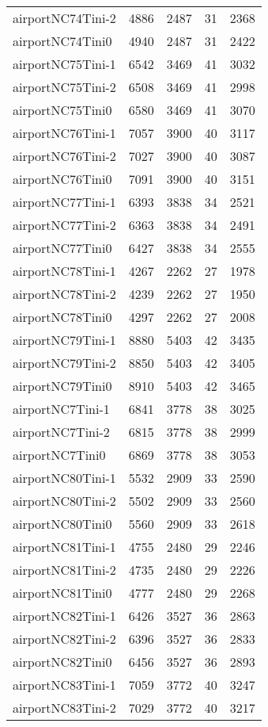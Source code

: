 \begin{longtable}{lrrrr}
airportNC74Tini-2 & 4886 & 2487 & 31 & 2368 \\
airportNC74Tini0 & 4940 & 2487 & 31 & 2422 \\
airportNC75Tini-1 & 6542 & 3469 & 41 & 3032 \\
airportNC75Tini-2 & 6508 & 3469 & 41 & 2998 \\
airportNC75Tini0 & 6580 & 3469 & 41 & 3070 \\
airportNC76Tini-1 & 7057 & 3900 & 40 & 3117 \\
airportNC76Tini-2 & 7027 & 3900 & 40 & 3087 \\
airportNC76Tini0 & 7091 & 3900 & 40 & 3151 \\
airportNC77Tini-1 & 6393 & 3838 & 34 & 2521 \\
airportNC77Tini-2 & 6363 & 3838 & 34 & 2491 \\
airportNC77Tini0 & 6427 & 3838 & 34 & 2555 \\
airportNC78Tini-1 & 4267 & 2262 & 27 & 1978 \\
airportNC78Tini-2 & 4239 & 2262 & 27 & 1950 \\
airportNC78Tini0 & 4297 & 2262 & 27 & 2008 \\
airportNC79Tini-1 & 8880 & 5403 & 42 & 3435 \\
airportNC79Tini-2 & 8850 & 5403 & 42 & 3405 \\
airportNC79Tini0 & 8910 & 5403 & 42 & 3465 \\
airportNC7Tini-1 & 6841 & 3778 & 38 & 3025 \\
airportNC7Tini-2 & 6815 & 3778 & 38 & 2999 \\
airportNC7Tini0 & 6869 & 3778 & 38 & 3053 \\
airportNC80Tini-1 & 5532 & 2909 & 33 & 2590 \\
airportNC80Tini-2 & 5502 & 2909 & 33 & 2560 \\
airportNC80Tini0 & 5560 & 2909 & 33 & 2618 \\
airportNC81Tini-1 & 4755 & 2480 & 29 & 2246 \\
airportNC81Tini-2 & 4735 & 2480 & 29 & 2226 \\
airportNC81Tini0 & 4777 & 2480 & 29 & 2268 \\
airportNC82Tini-1 & 6426 & 3527 & 36 & 2863 \\
airportNC82Tini-2 & 6396 & 3527 & 36 & 2833 \\
airportNC82Tini0 & 6456 & 3527 & 36 & 2893 \\
airportNC83Tini-1 & 7059 & 3772 & 40 & 3247 \\
airportNC83Tini-2 & 7029 & 3772 & 40 & 3217 \\

\end{longtable}

